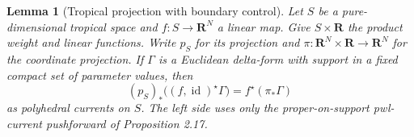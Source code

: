 \documentclass[11pt]{article}
\newtheorem{lemma}[theorem]{Lemma}
\theoremstyle{definition}
\theoremstyle{remark}
\numberwithin{equation}{section}
\begin{document}
\begin{lemma}[Tropical projection with boundary control]
\label{r11p:tropical-product-push}
Let $S$ be a pure-dimensional tropical space and
$f:S\to\mathbf R^N$ a linear map.  Give $S\times\mathbf R$ the
product weight and linear functions.  Write $p_S$ for its projection
and $\pi:\mathbf R^N\times\mathbf R\to\mathbf R^N$ for the coordinate
projection.  If $\Gamma$ is a Euclidean delta-form with support in
a fixed compact set of parameter values, then
\[
 (p_S)_*\bigl((f,\operatorname{id})^\star\Gamma\bigr)
                                      =f^\star(\pi_*\Gamma)
\tag{PS2}\label{r11p:tropical-product-push-identity}
\]
as polyhedral currents on $S$.  The left side uses only the
proper-on-support pwl-current pushforward of Proposition 2.17.
\end{lemma}
\end{document}
